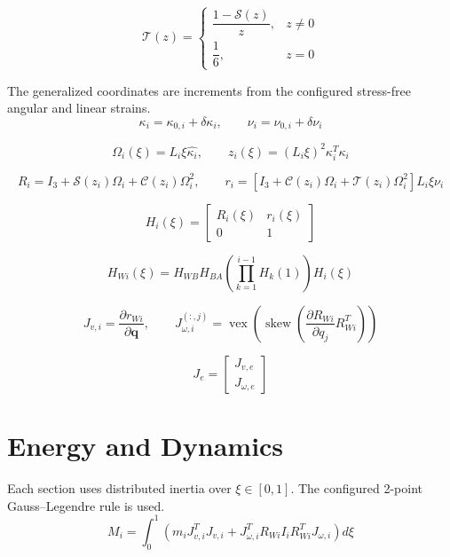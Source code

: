 \documentclass[11pt]{article}
\newcommand{\Sfun}{\mathcal{S}}
\newcommand{\Cfun}{\mathcal{C}}
\newcommand{\Tfun}{\mathcal{T}}
\begin{document}
\begin{equation}
\Tfun(z)=\begin{cases}\dfrac{1-\Sfun(z)}{z},&z\ne0\\\dfrac16,&z=0\end{cases}
\end{equation}

The generalized coordinates are increments from the configured stress-free angular and linear strains.
\begin{equation}
\kappa_i=\kappa_{0,i}+\delta\kappa_i,\qquad \nu_i=\nu_{0,i}+\delta\nu_i
\end{equation}

\begin{equation}
\Omega_i(\xi)=L_i\xi\widehat{\kappa_i},\qquad z_i(\xi)=(L_i\xi)^2\kappa_i^T\kappa_i
\end{equation}

\begin{equation}
R_i=I_3+\Sfun(z_i)\Omega_i+\Cfun(z_i)\Omega_i^2,\qquad r_i=\left[I_3+\Cfun(z_i)\Omega_i+\Tfun(z_i)\Omega_i^2\right]L_i\xi\nu_i
\end{equation}

\begin{equation}
H_i(\xi)=\begin{bmatrix}R_i(\xi)&r_i(\xi)\\0&1\end{bmatrix}\label{eq:local-transform}
\end{equation}

\begin{equation}
H_{Wi}(\xi)=H_{WB}H_{BA}\left(\prod_{k=1}^{i-1}H_k(1)\right)H_i(\xi)
\end{equation}

\begin{equation}
J_{v,i}=\frac{\partial r_{Wi}}{\partial\boldsymbol q},\qquad J_{\omega,i}^{(:,j)}=\operatorname{vex}\!\left(\operatorname{skew}\!\left(\frac{\partial R_{Wi}}{\partial q_j}R_{Wi}^{T}\right)\right)
\end{equation}

\begin{equation}
J_e=\begin{bmatrix}J_{v,e}\\J_{\omega,e}\end{bmatrix}
\end{equation}


\section{Energy and Dynamics}
Each section uses distributed inertia over $\xi\in[0,1]$. The configured 2-point Gauss--Legendre rule is used.
\begin{equation}
M_i=\int_0^1\!\left(m_iJ_{v,i}^{T}J_{v,i}+J_{\omega,i}^{T}R_{Wi}I_iR_{Wi}^{T}J_{\omega,i}\right)d\xi
\end{equation}
\end{document}
